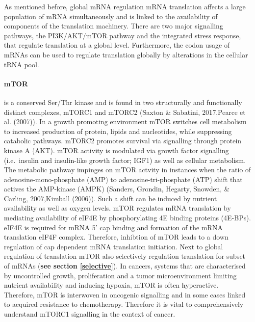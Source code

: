 \documentclass[12pt,openany]{book}
\begin{document}
As mentioned before, global mRNA regulation mRNA translation affects a
large population of mRNA simultaneously and is linked to the
availability of components of the translation machinery. There are two
major signalling pathways, the PI3K/AKT/mTOR pathway and the integrated
stress response, that regulate translation at a global level.
Furthermore, the codon usage of mRNAs can be used to regulate
translation globally by alterations in the cellular tRNA pool.

\paragraph{mTOR} \label{mTOR}

is a conserved Ser/Thr kinase and is found in two structurally and
functionally distinct complexes, mTORC1 and mTORC2 (Saxton \& Sabatini,
2017,Pearce et al. (2007)). In a growth promoting environment mTOR
switches cell metabolism to increased production of protein, lipids and
nucleotides, while suppressing catabolic pathways. mTORC2 promotes
survival via signalling through protein kinase A (AKT). mTOR activity is
modulated via growth factor signalling (i.e.~insulin and insulin-like
growth factor; IGF1) as well as cellular metabolism. The metabolic
pathway impinges on mTOR actvity in instances when the ratio of
adenosine-mono-phosphate (AMP) to adenosine-tri-phosphate (ATP) shift
that actives the AMP-kinase (AMPK) (Sanders, Grondin, Hegarty, Snowden,
\& Carling, 2007,Kimball (2006)). Such a shift can be induced by
nutrient availability as well as oxygen levels. mTOR regulates mRNA
translation by mediating availability of eIF4E by phosphorylating 4E
binding proteins (4E-BPs). eIF4E is required for mRNA 5' cap binding and
formation of the mRNA translation eIF4F complex. Therefore, inhibtion of
mTOR leads to a down regulation of cap dependent mRNA translation
initiation. Next to global regulation of translation mTOR also
selectively regulation translation for subset of mRNAs (\textbf{see
section \ref{selective}}). In cancers, systems that are characterised by
uncontrolled growth, proliferation and a tumor microenvironment limiting
nutrient availability and inducing hypoxia, mTOR is often hyperactive.
Therefore, mTOR ís interwoven in oncogenic signalling and in some cases
linked to acquired resistance to chemotherapy. Therefore it is vital to
comprehensively understand mTORC1 signalling in the context of cancer.
\end{document}
